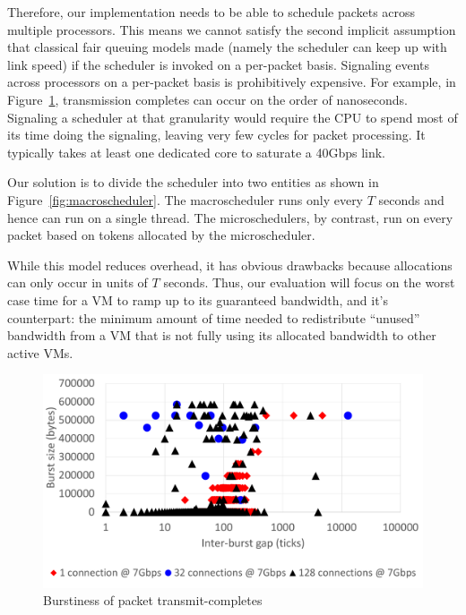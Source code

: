 Therefore, our implementation needs to be able to schedule packets across
multiple processors.  This means we cannot satisfy the second implicit
assumption that classical fair queuing models made (namely the scheduler can
keep up with link speed) if the scheduler is invoked on a per-packet basis.
Signaling events across processors on a per-packet basis is prohibitively
expensive.  For example, in Figure~\ref{completesburst}, transmission completes
can occur on the order of nanoseconds.  Signaling a scheduler at that
granularity would require the CPU to spend most of its time doing the signaling,
leaving very few cycles for packet processing.  It typically takes at least one
dedicated core to saturate a 40Gbps link. 

Our solution is to divide the scheduler into two entities as shown in
Figure~\ref{fig:macroscheduler}.   The macroscheduler runs only every $T$
seconds and hence can run on a single thread.   The microschedulers, by
contrast, run on every packet based on tokens allocated by the microscheduler.   

While this model reduces overhead, it has obvious drawbacks because allocations
can only occur in units of $T$ seconds. Thus, our evaluation will focus on the
worst case time for a VM to ramp up to its guaranteed bandwidth, and it's
counterpart: the minimum amount of time needed to redistribute ``unused''
bandwidth from a VM that is not fully using its allocated bandwidth to other
active VMs. 
\begin{figure}
\centering
\includegraphics[width=0.7\columnwidth, trim=60pt 20mm 0pt 8mm]{figures/completesburst}
\caption{Burstiness of packet transmit-completes}
\label{completesburst}
\vspace{-3mm}
\end{figure}
